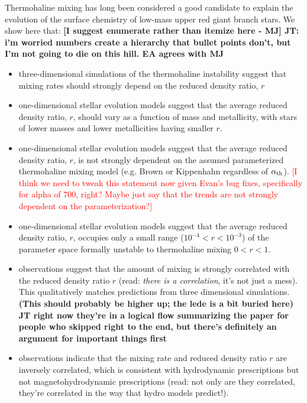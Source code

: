 Thermohaline mixing has long been considered a good candidate to explain the evolution of the surface chemistry of low-mass upper red giant branch stars. We show here that:
\textbf{[I suggest enumerate rather than itemize here - MJ] JT: i'm worried numbers create a hierarchy that bullet points don't, but I'm not going to die on this hill. EA agrees with MJ}
\begin{itemize}
    \item three-dimensional simulations of the thermohaline instability suggest that mixing rates should strongly depend on the reduced density ratio, $r$
    
    \item one-dimensional stellar evolution models suggest that the average reduced density ratio, $r$, should vary as a function of mass and metallicity, with stars of lower masses and lower metallicities having smaller $r$.
    
    \item one-dimensional stellar evolution models suggest that the average reduced density ratio, $r$, is not strongly dependent on the assumed parameterized thermohaline mixing model (e.g. Brown or Kippenhahn regardless of $\alpha_{\rm th}$). \textcolor{red}{[I think we need to tweak this statement now given Evan's bug fixes, specifically for alpha of 700, right? Maybe just say that the trends are not strongly dependent on the parameterization?]}
    
    \item one-dimensional stellar evolution models suggest that the average reduced density ratio, $r$, occupies only a small range ($10^{-4}<r<10^{-3}$) of the parameter space formally unstable to thermohaline mixing $0<r<1$.
    
    \item observations suggest that the amount of mixing is strongly correlated with the reduced density ratio $r$ (read: \emph{there is a correlation}, it's not just a mess). This qualitatively matches predictions from three dimensional simulations. {\bf (This should probably be higher up; the lede is a bit buried here) JT right now they're in a logical flow summarizing the paper for people who skipped right to the end, but there's definitely an argument for important things first}
    
    \item observations indicate that the mixing rate and reduced density ratio $r$ are inversely correlated, which is consistent with hydrodynamic prescriptions but not magnetohydrodynamic prescriptions (read: not only are they correlated, they're correlated in the way that hydro models predict!).
    
    \end{itemize}


